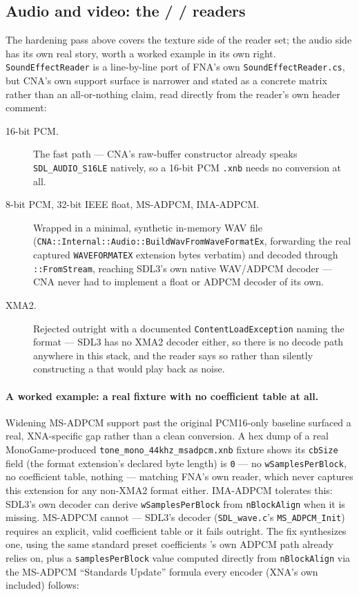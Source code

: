 \subsection{Audio and video: the  /  /  readers}
\label{sec:xnb-audio}

The hardening pass above covers the texture side of the reader set; the audio side has its own
real story, worth a worked example in its own right. \texttt{SoundEffectReader} is a
line-by-line port of FNA's own \texttt{SoundEffectReader.cs}, but CNA's own support surface is
narrower and stated as a concrete matrix rather than an all-or-nothing claim, read directly from
the reader's own header comment:

\begin{description}
  \item[16-bit PCM.] The fast path --- CNA's  raw-buffer constructor
        already speaks \texttt{SDL\_AUDIO\_S16LE} natively, so a 16-bit PCM \texttt{.xnb} needs
        no conversion at all.
  \item[8-bit PCM, 32-bit IEEE float, MS-ADPCM, IMA-ADPCM.] Wrapped in a minimal, synthetic
        in-memory WAV file (\texttt{CNA::Internal::Audio::BuildWavFromWaveFormatEx}, forwarding
        the real captured \texttt{WAVEFORMATEX} extension bytes verbatim) and decoded through
        \allowbreak{}\texttt{::FromStream}, reaching SDL3's own native
        WAV/ADPCM decoder --- CNA never had to implement a float or ADPCM decoder of its own.
  \item[XMA2.] Rejected outright with a documented \texttt{ContentLoadException} naming the
        format --- SDL3 has no XMA2 decoder either, so there is no decode path anywhere in this
        stack, and the reader says so rather than silently constructing a
         that would play back as noise.
\end{description}

\paragraph{A worked example: a real fixture with no coefficient table at all.}
Widening MS-ADPCM support past the original PCM16-only baseline surfaced a real, XNA-specific
gap rather than a clean conversion. A hex dump of a real MonoGame-produced
\texttt{tone\_mono\_44khz\_msadpcm.xnb} fixture shows its \texttt{cbSize} field (the format
extension's declared byte length) is \texttt{0} --- no \texttt{wSamplesPerBlock}, no coefficient
table, nothing --- matching FNA's own reader, which never captures this extension for any
non-XMA2 format either. IMA-ADPCM tolerates this: SDL3's own decoder can derive
\texttt{wSamplesPerBlock} from \texttt{nBlockAlign} when it is missing. MS-ADPCM cannot ---
SDL3's decoder (\texttt{SDL\_wave.c}'s \texttt{MS\_ADPCM\_Init}) requires an explicit,
valid coefficient table or it fails outright. The fix synthesizes one, using the same standard
preset coefficients 's own ADPCM path already relies on, plus a
\texttt{samplesPerBlock} value computed directly from \texttt{nBlockAlign} via the MS-ADPCM
``Standards Update'' formula every encoder (XNA's own included) follows:

